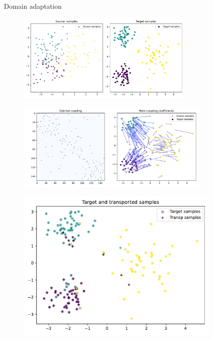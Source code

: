 \documentclass[pdf,aspectratio=169,10pt]{beamer}
\begin{document}
\begin{frame}{ Domain adaptation}

\begin{minipage}{0.49\textwidth}
\vspace{1em}
    \begin{figure}
        \includegraphics[width=0.78\textwidth]{../img/DA_original_samples.pdf}
    \end{figure}
\vspace{-0.5em}
    \begin{figure}
        \includegraphics[width=0.85\textwidth]{../img/DA_coupling.pdf}
    \end{figure}
    
\end{minipage}
\hfill
\begin{minipage}{0.49\textwidth}
    \begin{figure}
        \includegraphics[width=0.9\textwidth]{../img/DA_samples.pdf}
    \end{figure}
\end{minipage}


\end{frame}
\end{document}
